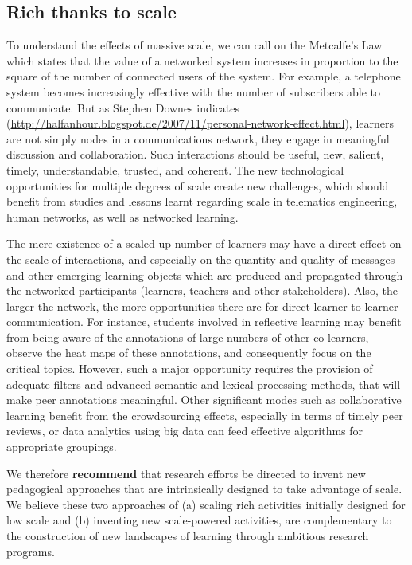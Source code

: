 \subsection{Rich thanks to scale}

To understand the effects of massive scale, we can call on the
Metcalfe’s Law which states that the value of a networked system
increases in proportion to the square of the number of connected users
of the system. For example, a telephone system becomes increasingly
effective with the number of subscribers able to communicate. But as
Stephen Downes indicates
(\url{http://halfanhour.blogspot.de/2007/11/personal-network-effect.html}),
learners are not simply nodes in a communications network, they engage
in meaningful discussion and collaboration. Such interactions should be
useful, new, salient, timely, understandable, trusted, and coherent. The
new technological opportunities for multiple degrees of scale create new
challenges, which should benefit from studies and lessons learnt
regarding scale in telematics engineering, human networks, as well as
networked learning.

The mere existence of a scaled up number of learners may have a direct
effect on the scale of interactions, and especially on the quantity and
quality of messages and other emerging learning objects which are
produced and propagated through the networked participants (learners,
teachers and other stakeholders). Also, the larger the network, the more
opportunities there are for direct learner-to-learner communication. For
instance, students involved in reflective learning may benefit from
being aware of the annotations of large numbers of other co-learners,
observe the heat maps of these annotations, and consequently focus on
the critical topics. However, such a major opportunity requires the
provision of adequate filters and advanced semantic and lexical
processing methods, that will make peer annotations meaningful. Other
significant modes such as collaborative learning benefit from the
crowdsourcing effects, especially in terms of timely peer reviews, or
data analytics using big data can feed effective algorithms for
appropriate groupings.

We therefore \textbf{recommend} that research efforts be directed to invent new
pedagogical approaches that are intrinsically designed to take advantage
of scale. We believe these two approaches of (a) scaling rich activities
initially designed for low scale and (b) inventing new scale-powered
activities, are complementary to the construction of new landscapes of
learning through ambitious research programs.
